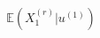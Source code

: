 \documentclass[preview]{standalone}
\begin{document}
\begin{align*}
\mathbb{E}(X^{(r)}_1|u^{(1)})
\end{align*}
\end{document}
